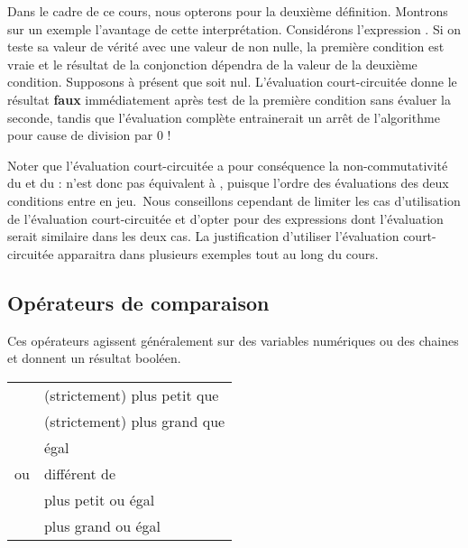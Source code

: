 			Dans le cadre de ce cours, nous opterons pour la deuxième définition.
			Montrons sur un exemple l’avantage de cette interprétation. Considérons
			l’expression 
			\textstyleCodeInsr{${\neq}$}. Si on teste sa valeur de vérité avec une
			valeur de  non nulle, la première condition est
			vraie et le résultat de la conjonction dépendra de la valeur de la
			deuxième condition. Supposons à présent que  soit
			nul. L’évaluation court-circuitée donne le résultat \textbf{faux}
			immédiatement après test de la première condition sans évaluer la
			seconde, tandis que l’évaluation complète entrainerait un arrêt de
			l’algorithme pour cause de division par 0 !
	
			Noter que l’évaluation court-circuitée a pour conséquence la
			non-commutativité du  et du
			:  n’est donc
			pas équivalent à , puisque l’ordre
			des évaluations des deux conditions entre en jeu.~Nous conseillons
			cependant de limiter les cas d’utilisation de l’évaluation
			court-circuitée et d'opter pour des expressions dont
			l’évaluation serait similaire dans les deux cas. La justification
			d’utiliser l’évaluation court-circuitée apparaitra dans plusieurs
			exemples tout au long du cours.
	
		\subsection{Opérateurs de comparaison}
	
			Ces opérateurs agissent généralement sur des variables numériques ou des
			chaines et donnent un résultat booléen.
	
			\begin{center}
			\tablehead{}
			\begin{supertabular}{m{2cm}|m{11cm}}
			\raggedleft  \textstyleCodeInsr{\textless} & (strictement) plus petit que\\
			\raggedleft  \textstyleCodeInsr{\textgreater} & (strictement) plus grand que\\
			\raggedleft  \textstyleCodeInsr{=} & égal\\
			\raggedleft  \textstyleCodeInsr{{\textless}{\textgreater}}
				ou \textstyleCodeInsr{${\neq}$} &  différent de\\
			\raggedleft  \textstyleCodeInsr{${\leq}$} & plus petit ou égal\\
			\raggedleft  \textstyleCodeInsr{${\geq}$} & plus grand ou égal\\
			\end{supertabular}
			\end{center}
	
